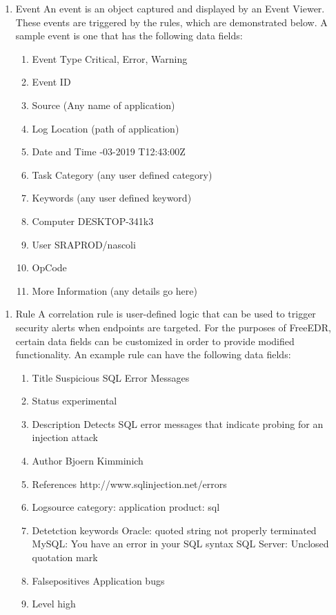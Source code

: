 \documentclass{scrreprt}
\begin{document}
\begin{enumerate}[label*=D\arabic*.]
    \item Event
	\subitem An event is an object captured and displayed by an Event Viewer. These events are triggered by the rules, which are demonstrated below. A sample event is one that has the following data fields:
    \begin{enumerate}[label*=\arabic*.]
	\item Event Type
	\subitem Critical, Error, Warning
	\item Event ID
	\item Source
	\subitem (Any name of application)
	\item Log Location
	\subitem (path of application)
	\item Date and Time
	-03-2019 T12:43:00Z
	\item Task Category
	\subitem (any user defined category)
	\item Keywords
	\subitem (any user defined keyword)
	\item Computer
	\subitem DESKTOP-341k3
	\item User
	\subitem SRAPROD/nascoli
	\item OpCode
	\item More Information
	\subitem (any details go here)

\end{enumerate}
\end{enumerate}


\begin{enumerate}[resume*]
    \item Rule
	\subitem A correlation rule is user-defined logic that can be used to trigger security alerts when endpoints are targeted. For the purposes of FreeEDR, certain data fields can be customized in order to provide modified functionality. An example rule can have the following data fields:
    \begin{enumerate}[label*=\arabic*.]
	\item Title
	\subitem Suspicious SQL Error Messages
	\item Status
	\subitem experimental
	\item Description
	\subitem Detects SQL error messages that indicate probing for an injection attack
	\item Author
	\subitem Bjoern Kimminich
	\item References
	\subitem http://www.sqlinjection.net/errors
	\item Logsource
	\subitem   category: application
  	\subitem   product: sql
	\item Detetction
	\subitem keywords
	\subitem Oracle: quoted string not properly terminated
	\subitem MySQL: You have an error in your SQL syntax
	\subitem SQL Server: Unclosed quotation mark
	\item Falsepositives
	\subitem Application bugs
	\item Level
	\subitem high
\end{enumerate}
\end{enumerate}
\end{document}
